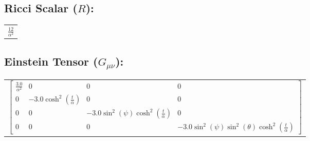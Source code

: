 \documentclass[12pt,a4paper]{article}
\begin{document}
\subsection*{Ricci Scalar ($R$):}
\begin{longtable}{c}
$\frac{12}{\alpha^{2}}$ \\
\end{longtable}

\subsection*{Einstein Tensor ($G_{\mu\nu}$):}
\begin{longtable}{c}
$\left[\begin{matrix}\frac{3.0}{\alpha^{2}} & 0 & 0 & 0\\0 & - 3.0 \cosh^{2}{\left(\frac{t}{\alpha} \right)} & 0 & 0\\0 & 0 & - 3.0 \sin^{2}{\left(\psi \right)} \cosh^{2}{\left(\frac{t}{\alpha} \right)} & 0\\0 & 0 & 0 & - 3.0 \sin^{2}{\left(\psi \right)} \sin^{2}{\left(\theta \right)} \cosh^{2}{\left(\frac{t}{\alpha} \right)}\end{matrix}\right]$ \\
\end{longtable}
\end{document}
